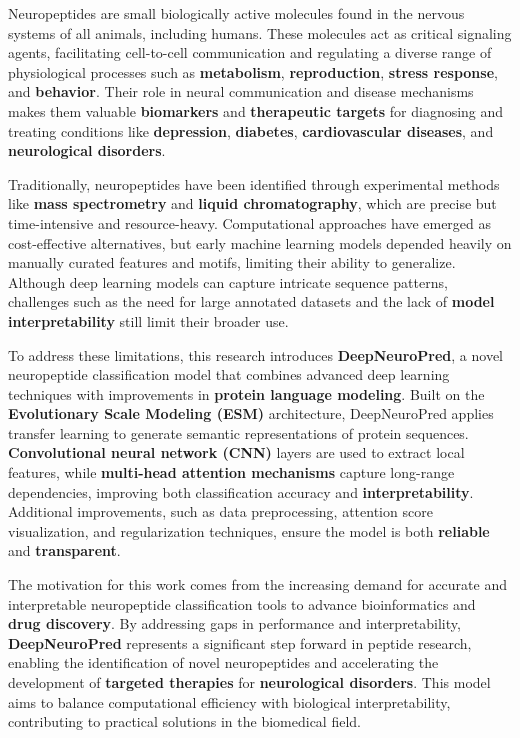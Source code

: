 \documentclass[conference]{IEEEtran}
\begin{document}
Neuropeptides are small biologically active molecules found in the nervous systems of all animals, including humans. These molecules act as critical signaling agents, facilitating cell-to-cell communication and regulating a diverse range of physiological processes such as \textbf{metabolism}, \textbf{reproduction}, \textbf{stress response}, and \textbf{behavior}. Their role in neural communication and disease mechanisms makes them valuable \textbf{biomarkers} and \textbf{therapeutic targets} for diagnosing and treating conditions like \textbf{depression}, \textbf{diabetes}, \textbf{cardiovascular diseases}, and \textbf{neurological disorders}.

Traditionally, neuropeptides have been identified through experimental methods like \textbf{mass spectrometry} and \textbf{liquid chromatography}, which are precise but time-intensive and resource-heavy. Computational approaches have emerged as cost-effective alternatives, but early machine learning models depended heavily on manually curated features and motifs, limiting their ability to generalize. Although deep learning models can capture intricate sequence patterns, challenges such as the need for large annotated datasets and the lack of \textbf{model interpretability} still limit their broader use.

To address these limitations, this research introduces \textbf{DeepNeuroPred}, a novel neuropeptide classification model that combines advanced deep learning techniques with improvements in \textbf{protein language modeling}. Built on the \textbf{Evolutionary Scale Modeling (ESM)} architecture, DeepNeuroPred applies transfer learning to generate semantic representations of protein sequences. \textbf{Convolutional neural network (CNN)} layers are used to extract local features, while \textbf{multi-head attention mechanisms} capture long-range dependencies, improving both classification accuracy and \textbf{interpretability}. Additional improvements, such as data preprocessing, attention score visualization, and regularization techniques, ensure the model is both \textbf{reliable} and \textbf{transparent}.

The motivation for this work comes from the increasing demand for accurate and interpretable neuropeptide classification tools to advance bioinformatics and \textbf{drug discovery}. By addressing gaps in performance and interpretability, \textbf{DeepNeuroPred} represents a significant step forward in peptide research, enabling the identification of novel neuropeptides and accelerating the development of \textbf{targeted therapies} for \textbf{neurological disorders}. This model aims to balance computational efficiency with biological interpretability, contributing to practical solutions in the biomedical field.
\end{document}
